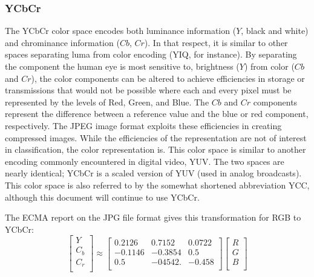 \documentclass[letterpaper]{report}
\begin{document}
\subsubsection{YCbCr}
The YCbCr color space encodes both luminance information ($Y$, black and white) and chrominance information ($Cb$, $Cr$). In that respect, it is similar to other spaces separating luma from color encoding (YIQ, for instance). By separating the component the human eye is most sensitive to, brightness ($Y$) from color ($Cb$ and $Cr$), the color components can be altered to achieve efficiencies in storage or transmissions that would not be possible where each and every pixel must be represented by the levels of Red, Green, and Blue.  The $Cb$ and $Cr$ components represent the difference between a reference value and the blue or red component, respectively. The JPEG image format exploits these efficiencies in creating compressed images. While the efficiencies of the representation are not of interest in classification, the color representation is. This color space is similar to another encoding commonly encountered in digital video, YUV. The two spaces are nearly identical; YCbCr is a scaled version of YUV (used in analog broadcasts). This color space is also referred to by the somewhat shortened abbreviation YCC, although this document will continue to use YCbCr.

The ECMA report on the JPG file format gives this transformation for RGB to YCbCr:
\nocite{Ecma2019-yo}
\begin{equation}
	\begin{bmatrix}
	Y \\[0.3em]
	C_b \\[0.3em]
	C_r \\[0.3em]
	\end{bmatrix}
	\approx
	\begin{bmatrix}
	0.2126 & 0.7152 & 0.0722 \\[0.3em]
	-0.1146 & -0.3854 & 0.5 \\[0.3em]
	0.5 & -04542. & -0.458 \\[0.3em]
	\end{bmatrix}
	\begin{bmatrix}
	R \\[0.3em]
	G \\[0.3em]
	B \\[0.3em]
	\end{bmatrix}	
\end{equation}
\end{document}
